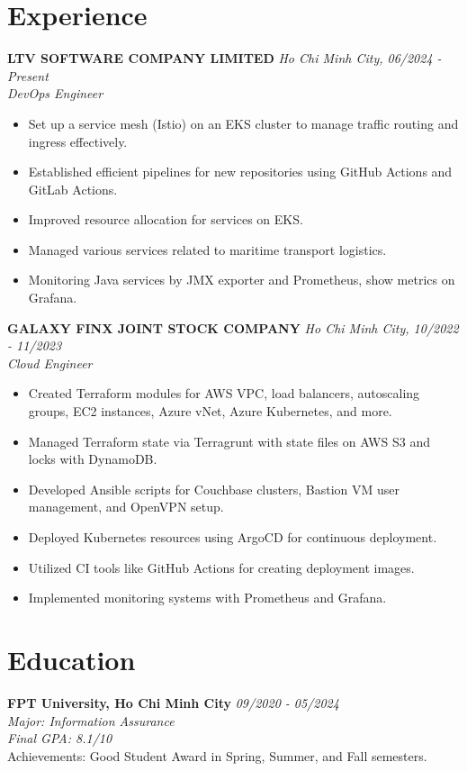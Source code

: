 \documentclass[a4paper,10pt]{article}
\begin{document}
\vspace{5pt}
\section*{Experience}
\noindent \textbf{LTV SOFTWARE COMPANY LIMITED} \hfill \textit{Ho Chi Minh City, 06/2024 - Present}  \\
\textit{DevOps Engineer}
\begin{itemize}[leftmargin=0.5in]
    \item Set up a service mesh (Istio) on an EKS cluster to manage traffic routing and ingress effectively.
    \item Established efficient pipelines for new repositories using GitHub Actions and GitLab Actions.
    \item Improved resource allocation for services on EKS.
    \item Managed various services related to maritime transport logistics.
    \item Monitoring Java services by JMX exporter and Prometheus, show metrics on Grafana.
\end{itemize}

\vspace{5pt}
\noindent \textbf{GALAXY FINX JOINT STOCK COMPANY} \hfill \textit{Ho Chi Minh City, 10/2022 - 11/2023} \\
\textit{Cloud Engineer}
\begin{itemize}[leftmargin=0.5in]
    \item Created Terraform modules for AWS VPC, load balancers, autoscaling groups, EC2 instances, Azure vNet, Azure Kubernetes, and more.
    \item Managed Terraform state via Terragrunt with state files on AWS S3 and locks with DynamoDB.
    \item Developed Ansible scripts for Couchbase clusters, Bastion VM user management, and OpenVPN setup.
    \item Deployed Kubernetes resources using ArgoCD for continuous deployment.
    \item Utilized CI tools like GitHub Actions for creating deployment images.
    \item Implemented monitoring systems with Prometheus and Grafana.
\end{itemize}

\vspace{5pt}
\section*{Education}
\noindent \textbf{FPT University, Ho Chi Minh City} \hfill \textit{09/2020 - 05/2024} \\
\textit{Major: Information Assurance} \\
\textit{Final GPA: 8.1/10} \\
Achievements: Good Student Award in Spring, Summer, and Fall semesters.
\end{document}
